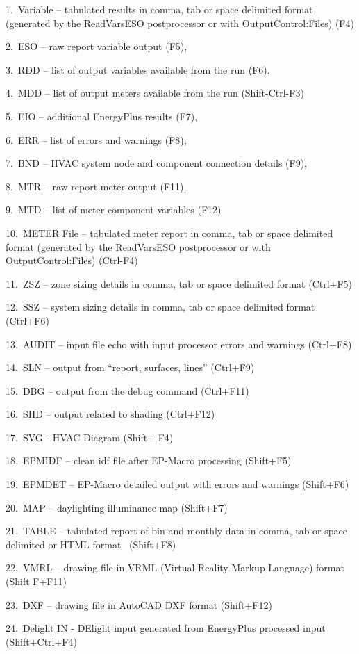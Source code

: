 1.~Variable -- tabulated results in comma, tab or space delimited format (generated by the ReadVarsESO postprocessor or with OutputControl:Files) (F4)

2.~ESO -- raw report variable output (F5),

3.~RDD -- list of output variables available from the run (F6).

4.~MDD -- list of output meters available from the run (Shift-Ctrl-F3)

5.~EIO -- additional EnergyPlus results (F7),

6.~ERR -- list of errors and warnings (F8),

7.~BND -- HVAC system node and component connection details (F9),

8.~MTR -- raw report meter output (F11),

9.~MTD -- list of meter component variables (F12)

10.~METER File -- tabulated meter report in comma, tab or space delimited format (generated by the ReadVarsESO postprocessor or with OutputControl:Files) (Ctrl-F4)

11.~ZSZ -- zone sizing details in comma, tab or space delimited format (Ctrl+F5)

12.~SSZ -- system sizing details in comma, tab or space delimited format (Ctrl+F6)

13.~AUDIT -- input file echo with input processor errors and warnings (Ctrl+F8)

14.~SLN -- output from ``report, surfaces, lines'' (Ctrl+F9)

15.~DBG -- output from the debug command (Ctrl+F11)

16.~SHD -- output related to shading (Ctrl+F12)

17.~SVG - HVAC Diagram (Shift+ F4)

18.~EPMIDF -- clean idf file after EP-Macro processing (Shift+F5)

19.~EPMDET -- EP-Macro detailed output with errors and warnings (Shift+F6)

20.~MAP -- daylighting illuminance map (Shift+F7)

21.~TABLE -- tabulated report of bin and monthly data in comma, tab or space delimited or HTML format~ (Shift+F8)

22.~VMRL -- drawing file in VRML (Virtual Reality Markup Language) format (Shift F+F11)

23.~DXF -- drawing file in AutoCAD DXF format (Shift+F12)

24.~Delight IN - DElight input generated from EnergyPlus processed input (Shift+Ctrl+F4)

